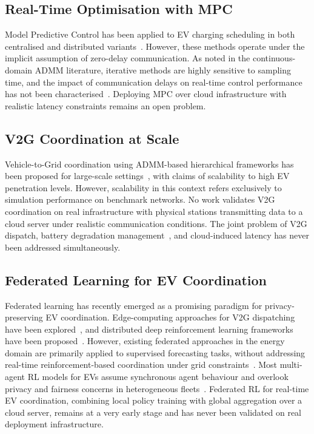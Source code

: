 \documentclass[review]{elsarticle}
\begin{document}
\subsection{Real-Time Optimisation with MPC}

Model Predictive Control has been applied to EV charging scheduling 
in both centralised and distributed 
variants~\cite{zheng2019online, gonzalez2021mpc, sen2024distributed}. 
However, these methods operate under the implicit assumption of 
zero-delay communication. As noted in the continuous-domain ADMM 
literature, iterative methods are highly sensitive to sampling time, 
and the impact of communication delays on real-time control 
performance has not been 
characterised~\cite{ma2016efficient, ardakanian2013distributed}. 
Deploying MPC over cloud infrastructure with realistic latency 
constraints remains an open problem.

\subsection{V2G Coordination at Scale}

Vehicle-to-Grid coordination using ADMM-based hierarchical frameworks 
has been proposed for large-scale 
settings~\cite{shao2021optimal, patil2021grid, shao2024decentralized}, 
with claims of scalability to high EV penetration levels. However, 
scalability in this context refers exclusively to simulation 
performance on benchmark networks. No work validates V2G coordination 
on real infrastructure with physical stations 
transmitting data to a cloud server under realistic communication 
conditions. The joint problem of V2G dispatch, battery degradation 
management~\cite{bashash2011plugin, wei2018ev}, and cloud-induced 
latency has never been addressed simultaneously.

\subsection{Federated Learning for EV Coordination}

Federated learning has recently emerged as a promising paradigm for 
privacy-preserving EV coordination. Edge-computing approaches for 
V2G dispatching have been 
explored~\cite{shang2022achieving, shang2024information}, and 
distributed deep reinforcement learning frameworks have been 
proposed~\cite{wan2019modelfree, li2020constrained, park2022multiagent}. 
However, existing federated approaches in the energy domain are 
primarily applied to supervised forecasting tasks, without addressing 
real-time reinforcement-based coordination under grid 
constraints~\cite{qiu2023rl}. Most multi-agent RL models for EVs 
assume synchronous agent behaviour and overlook privacy and fairness 
concerns in heterogeneous 
fleets~\cite{qian2022multiagent, wang2021rl}. Federated RL for 
real-time EV coordination, combining local policy training with 
global aggregation over a cloud server, remains at a very early stage 
and has never been validated on real deployment infrastructure.
\end{document}
